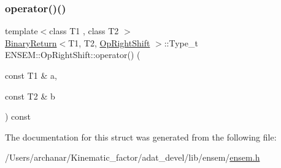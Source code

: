 \mbox{\label{structENSEM_1_1OpRightShift_a8cfd6827272b2d7eda3b0912d67e4967}} 
\subsubsection{\texorpdfstring{operator()()}{operator()()}\hspace{0.1cm}{\footnotesize\ttfamily [2/2]}}
{\footnotesize\ttfamily template$<$class T1 , class T2 $>$ \\
\mbox{\hyperlink{structENSEM_1_1BinaryReturn}{Binary\+Return}}$<$T1, T2, \mbox{\hyperlink{structENSEM_1_1OpRightShift}{Op\+Right\+Shift}} $>$\+::Type\+\_\+t E\+N\+S\+E\+M\+::\+Op\+Right\+Shift\+::operator() (\begin{DoxyParamCaption}\item[{const T1 \&}]{a,  }\item[{const T2 \&}]{b }\end{DoxyParamCaption}) const\hspace{0.3cm}{\ttfamily [inline]}}



The documentation for this struct was generated from the following file\+:\begin{DoxyCompactItemize}
\item 
/\+Users/archanar/\+Kinematic\+\_\+factor/adat\+\_\+devel/lib/ensem/\mbox{\hyperlink{lib_2ensem_2ensem_8h}{ensem.\+h}}\end{DoxyCompactItemize}
